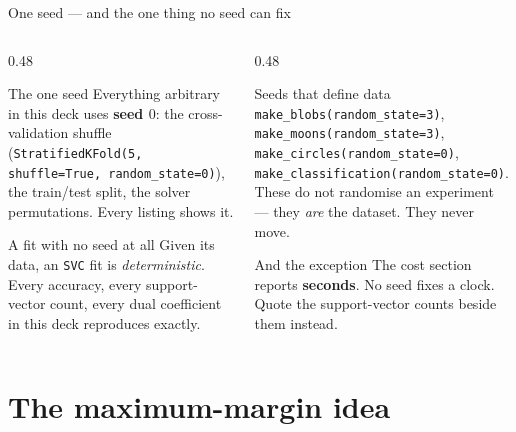 \documentclass[aspectratio=169]{beamer}
\begin{document}
\begin{frame}[shrink=6]{One seed --- and the one thing no seed can fix}
  \begin{columns}[T]
    \begin{column}{0.48\textwidth}
      \begin{block}{The one seed}
        \small Everything arbitrary in this deck uses \textbf{seed $0$}:
        the cross-validation shuffle
        (\texttt{StratifiedKFold(5, shuffle=True, random\_state=0)}), the
        train/test split, the solver permutations. Every listing shows it.
      \end{block}
      \begin{exampleblock}{A fit with no seed at all}
        \small Given its data, an \texttt{SVC} fit is \emph{deterministic}.
        Every accuracy, every support-vector count, every dual coefficient in
        this deck reproduces exactly.
      \end{exampleblock}
    \end{column}
    \begin{column}{0.48\textwidth}
      \begin{block}{Seeds that define data}
        \small \texttt{make\_blobs(random\_state=3)},
        \texttt{make\_moons(random\_state=3)},
        \texttt{make\_circles(random\_state=0)},
        \texttt{make\_classification(random\_state=0)}. These do not
        randomise an experiment --- they \emph{are} the dataset. They never
        move.
      \end{block}
      \begin{alertblock}{And the exception}
        \small The cost section reports \textbf{seconds}. No seed fixes a
        clock. Quote the support-vector counts beside them instead.
      \end{alertblock}
    \end{column}
  \end{columns}
\end{frame}

\section[Maximum margin]{The maximum-margin idea}
\label{sec:margin}
\end{document}
